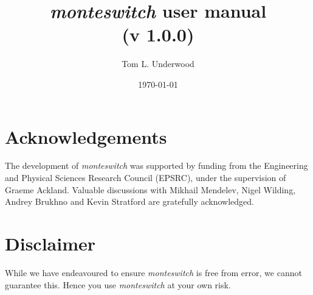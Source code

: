 \documentclass{report}
\begin{document}
\sloppy

\title{\emph{monteswitch} user manual\\ (v 1.0.0)}
\author{Tom L. Underwood}
\date{\today}
\maketitle


\tableofcontents


\chapter*{Acknowledgements}
The development of \emph{monteswitch} was supported by funding from the Engineering and Physical Sciences Research Council (EPSRC),
under the supervision of Graeme Ackland. Valuable discussions with Mikhail Mendelev, Nigel Wilding, Andrey Brukhno and Kevin Stratford 
are gratefully acknowledged.

\chapter*{Disclaimer}
While we have endeavoured to ensure \emph{monteswitch} is free from error, we cannot guarantee this. Hence you use \emph{monteswitch}
at your own risk.

\renewcommand{\nomname}{List of Abbreviations}
\printnomenclature

\end{document}
